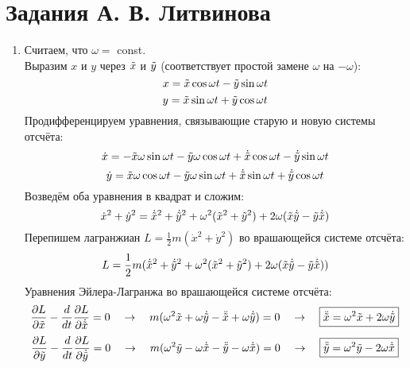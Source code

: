 \documentclass[12pt]{article}
\begin{document}
\section{Задания А. В. Литвинова}
\begin{enumerate}
    \item Считаем, что $\omega=$ const.\\
    Выразим $x$ и $y$ через $\Tilde{x}$ и $\Tilde{y}$ (соответствует простой замене $\omega$ на $-\omega$):
    \[x=\Tilde{x}\cos\omega t-\Tilde{y}\sin\omega t\]
    \[y=\Tilde{x}\sin\omega t+\Tilde{y}\cos\omega t\]
    Продифференцируем уравнения, связывающие старую и новую системы отсчёта:
    \begin{equation*}
        \dot{x}=-\Tilde{x}\omega\sin\omega t-\Tilde{y}\omega\cos\omega t+\dot{\Tilde{x}}\cos\omega t-\dot{\Tilde{y}}\sin\omega t
    \end{equation*}
    \begin{equation*}
        \dot{y}=\Tilde{x}\omega\cos\omega t-\Tilde{y}\omega\sin\omega t+\dot{\Tilde{x}}\sin\omega t+\dot{\Tilde{y}}\cos\omega t
    \end{equation*}
    Возведём оба уравнения в квадрат и сложим:
    \begin{equation}
        \dot{x}^2+\dot{y}^2=\dot{\Tilde{x}}^2+\dot{\Tilde{y}}^2+\omega^2(\Tilde{x}^2+\Tilde{y}^2)+2\omega(\Tilde{x}\dot{\Tilde{y}}-\Tilde{y}\dot{\Tilde{x}})
    \end{equation}
    Перепишем лагранжиан $L=\frac{1}{2}m(\dot{x}^2+\dot{y}^2)$ во врашающейся системе отсчёта:
    \begin{equation}
        L=\frac{1}{2}m(\dot{\Tilde{x}}^2+\dot{\Tilde{y}}^2+\omega^2(\Tilde{x}^2+\Tilde{y}^2)+2\omega(\Tilde{x}\dot{\Tilde{y}}-\Tilde{y}\dot{\Tilde{x}}))
    \end{equation}
    Уравнения Эйлера-Лагранжа во врашающейся системе отсчёта:
    \begin{equation}
        \frac{\partial L}{\partial\Tilde{x}}-\frac{d}{dt}\frac{\partial L}{\partial \dot{\Tilde{x}}}=0\quad \rightarrow\quad m(\omega^2\Tilde{x}+\omega\dot{\Tilde{y}}-\Ddot{\Tilde{x}}+\omega\dot{\Tilde{y}})=0\quad \rightarrow \quad \boxed{\Ddot{\Tilde{x}}=\omega^2\Tilde{x}+2\omega\dot{\Tilde{y}}}
    \end{equation}
    \begin{equation}
        \frac{\partial L}{\partial\Tilde{y}}-\frac{d}{dt}\frac{\partial L}{\partial \dot{\Tilde{y}}}=0\quad \rightarrow\quad m(\omega^2\Tilde{y}-\omega\dot{\Tilde{x}}-\Ddot{\Tilde{y}}-\omega\dot{\Tilde{x}})=0\quad \rightarrow \quad \boxed{\Ddot{\Tilde{y}}=\omega^2\Tilde{y}-2\omega\dot{\Tilde{x}}}

\end{equation}
\end{enumerate}
\end{document}
